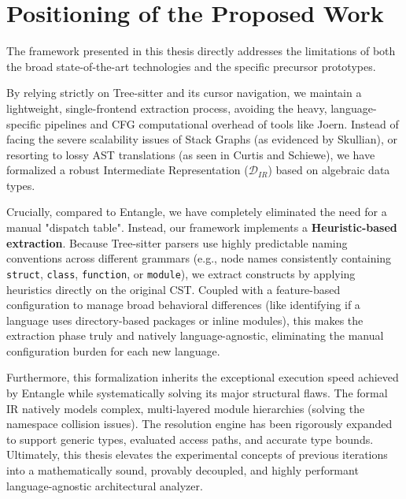 \section{Positioning of the Proposed Work}

The framework presented in this thesis directly addresses the
limitations of both the broad state-of-the-art technologies and the
specific precursor prototypes.

By relying strictly on Tree-sitter and its cursor navigation, we
maintain a lightweight, single-frontend extraction process, avoiding
the heavy, language-specific pipelines and CFG computational overhead
of tools like Joern. Instead of facing the severe scalability issues
of Stack Graphs (as evidenced by Skullian), or resorting to lossy AST
translations (as seen in Curtis and Schiewe), we have formalized a
robust Intermediate Representation ($\mathcal{D}_{IR}$) based on
algebraic data types.

Crucially, compared to Entangle, we have completely eliminated the
need for a manual "dispatch table". Instead, our framework implements
a \textbf{Heuristic-based extraction}. Because Tree-sitter parsers
use highly predictable naming conventions across different grammars
(e.g., node names consistently containing \texttt{struct},
\texttt{class}, \texttt{function}, or \texttt{module}), we extract
constructs by applying heuristics directly on the original CST.
Coupled with a feature-based configuration to manage broad behavioral
differences (like identifying if a language uses directory-based
packages or inline modules), this makes the extraction phase truly
and natively language-agnostic, eliminating the manual configuration
burden for each new language.

Furthermore, this formalization inherits the exceptional execution
speed achieved by Entangle while systematically solving its major
structural flaws. The formal IR natively models complex,
multi-layered module hierarchies (solving the namespace collision
issues). The resolution engine has been rigorously expanded to
support generic types, evaluated access paths, and accurate type
bounds. Ultimately, this thesis elevates the experimental concepts of
previous iterations into a mathematically sound, provably decoupled,
and highly performant language-agnostic architectural analyzer.
